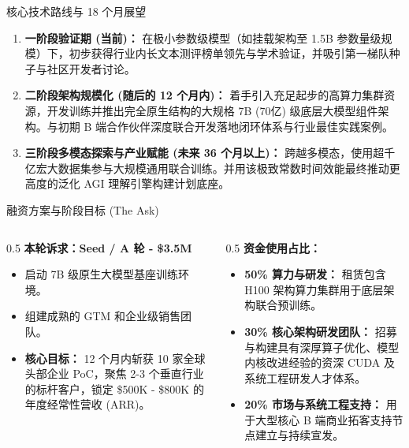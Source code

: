 ﻿\documentclass[aspectratio=169, 10pt]{beamer}
\begin{document}
\begin{frame}{核心技术路线与 18 个月展望}
\begin{enumerate}
    \item \textbf{一阶段验证期 (当前)：} 在极小参数级模型（如挂载架构至 1.5B 参数量级规模）下，初步获得行业内长文本测评榜单领先与学术验证，并吸引第一梯队种子与社区开发者讨论。
    \vspace{0.5em}
    \item \textbf{二阶段架构规模化 (随后的 12 个月内)：} 着手引入充足起步的高算力集群资源，开发训练并推出完全原生结构的大规格 7B (70亿) 级底层大模型组件架构。与初期 B 端合作伙伴深度联合开发落地闭环体系与行业最佳实践案例。
    \vspace{0.5em}
    \item \textbf{三阶段多模态探索与产业赋能 (未来 36 个月以上)：} 跨越多模态，使用超千亿宏大数据集参与大规模通用联合训练。并用该极致常数时间效能最终推动更高度的泛化 AGI 理解引擎构建计划底座。
\end{enumerate}
\end{frame}

\begin{frame}{融资方案与阶段目标 (The Ask)}
\begin{columns}
\begin{column}{0.5\textwidth}
\textbf{本轮诉求：Seed / A 轮 - \$3.5M}
\vspace{0.5em}
\begin{itemize}
    \item 启动 7B 级原生大模型基座训练环境。
    \item 组建成熟的 GTM 和企业级销售团队。
    \item \textbf{核心目标：} 12 个月内斩获 10 家全球头部企业 PoC，聚焦 2-3 个垂直行业的标杆客户，锁定 \$500K - \$800K 的年度经常性营收 (ARR)。
\end{itemize}
\end{column}
\begin{column}{0.5\textwidth}
\textbf{资金使用占比：}
\begin{itemize}
    \item \textbf{50\% 算力与研发：} 租赁包含 H100 架构算力集群用于底层架构联合预训练。
    \item \textbf{30\% 核心架构研发团队：} 招募与构建具有深厚算子优化、模型内核改进经验的资深 CUDA 及系统工程研发人才体系。
    \item \textbf{20\% 市场与系统工程支持：} 用于大型核心 B 端商业拓客支持节点建立与持续宣发。
\end{itemize}
\end{column}
\end{columns}
\end{frame}
\end{document}
